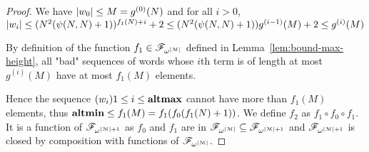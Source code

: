 \begin{proof}
	We have $|w_0| \leq M = g^{(0)}(N)$ and for all $i>0$, $|w_i| \leq (N^2(\psi(N,N)+1))^{f_1(N) + i} + 2 \leq (N^2(\psi(N,N)+1)) g^{(i-1)}(M) + 2 \leq g^{(i)}(M)$
	
	By definition of the function $f_1 \in \mathscr{F}_{\omega^{|\mathcal{M}|}}$ defined in Lemma~\ref{lem:bound-max-height}, all "bad" sequences of words whose $i$th term is of length at most $g^{(i)}(M)$ have at most $f_1(M)$ elements.
	
	Hence the sequence $(w_i){1\leq i \leq \mathbf{altmax}}$ cannot have more than $f_1(M)$ elements, thus $\mathbf{altmin} \leq f_1(M) = f_1(f_0(f_1(N)+1))$.
	We define $f_2$ as $f_1 \circ f_0 \circ f_1$. It is a function of $\mathscr{F}_{\omega^{|\mathcal{M}|+1}}$ as $f_0$ and $f_1$ are in $\mathscr{F}_{\omega^{|\mathcal{M}|}} \subseteq \mathscr{F}_{\omega^{|\mathcal{M}|+1}}$ and $\mathscr{F}_{\omega^{|\mathcal{M}|+1}}$ is closed by composition with functions of $\mathscr{F}_{\omega^{|\mathcal{M}|}}$.
\end{proof}

\PropBoundTreeSize*

